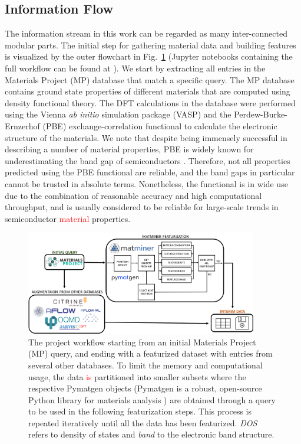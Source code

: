 \documentclass[superscriptaddress,unsortedaddress,
 amsmath,amssymb,
 aps,
]{revtex4-2}
\newcommand{\mrk}[1]{\textcolor{red}{#1}}
\begin{document}
\subsection*{Information Flow} 
The information stream in this work can be regarded as many inter-connected modular parts. 
The initial step for gathering material data and building features is visualized by the outer flowchart in Fig.~\ref{fig:flowchart} (Jupyter notebooks containing the full 
workflow can be found at \cite{Ohebbi2021}).
We start by extracting all entries in the Materials Project (MP) database  \cite{Jain2013,Jain2018} that match a specific query.  
The MP database contains ground state properties of different materials that are computed using density functional theory. The DFT calculations in the database were performed using the Vienna {\em ab initio} simulation package (VASP) \cite{Kresse1996} and the Perdew-Burke-Ernzerhof (PBE) \cite{Perdew1996} exchange-correlation functional to calculate the electronic structure of the materials. 
We note that despite being immensely successful in describing a number of material properties, PBE is widely known for underestimating the band gap of semiconductors \cite{Freysoldt2014}. Therefore, not all properties predicted using the PBE functional are reliable, and the band gaps in particular cannot be trusted in absolute terms. Nonetheless, the functional is in wide use due to the combination of reasonable accuracy and high computational throughput, and is usually considered to be reliable for large-scale trends in semiconductor \mrk{material} properties. 

\begin{figure}[t]
    \centering
    \includegraphics[width=0.9\textwidth]{figures/flow_chart_2.png}
    \caption{The project workflow starting from an initial Materials Project (MP) query, and ending with a featurized dataset with entries from several other databases. 
    To limit the memory and computational usage, the data \mrk{is} partitioned into smaller subsets where the respective Pymatgen objects (Pymatgen is a robust, open-source Python library for materials analysis \cite{pymatgen}) are obtained through a query to be used in the following featurization steps. This process is repeated iteratively until all the data has been featurized. \emph{DOS} refers to density of states and \emph{band} to the electronic band structure. 
    }
    \label{fig:flowchart}
\end{figure}
\end{document}
